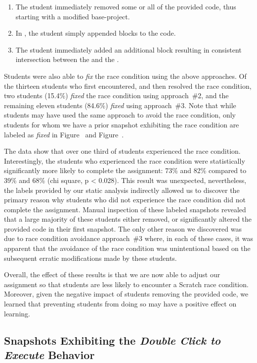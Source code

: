 \begin{enumerate}
\item The student immediately removed some or all of the provided code, thus
  starting with a modified base-project.
\item In \stwo{}, the student simply appended \glideto{} blocks to the code.
\item The student immediately added an additional \glideDIST{} block resulting
  in consistent intersection between the \net{} and the \zebra{}.
\end{enumerate}

Students were also able to \emph{fix} the race condition using the above
approaches. Of the thirteen students who first encountered, and then resolved
the race condition, two students (15.4\%) \emph{fixed} the race condition using
approach~\#2, and the remaining eleven students (84.6\%) \emph{fixed} using
approach~\#3. Note that while students may have used the same approach to avoid
the race condition, only students for whom we have a prior snapshot exhibiting
the race condition are labeled as \emph{fixed} in Figure~
and Figure~.

The data show that over one third of students experienced the race
condition. Interestingly, the students who experienced the race condition were
statistically significantly more likely to complete the assignment: 73\% and
82\% compared to 39\% and 68\% (chi square, p \textless{} 0.028). This result
was unexpected, nevertheless, the labels provided by our static analysis
indirectly allowed us to discover the primary reason why students who did not
experience the race condition did not complete the assignment. Manual
inspection of these labeled snapshots revealed that a large majority of these
students either removed, or significantly altered the provided code in their
first snapshot. The only other reason we discovered was due to race condition
avoidance approach~\#3 where, in each of these cases, it was apparent that the
avoidance of the race condition was unintentional based on the subsequent
erratic modifications made by these students.

Overall, the effect of these results is that we are now able to adjust our
assignment so that students are less likely to encounter a Scratch race
condition. Moreover, given the negative impact of students removing the
provided code, we learned that preventing students from doing so may have a
positive effect on learning.

\subsection{Snapshots Exhibiting the \emph{Double Click to Execute} Behavior}

